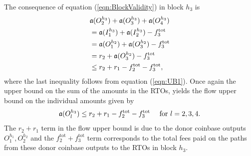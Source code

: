 The consequence of equation (\ref{eqn:BlockValidity}) in block $h_3$ is 
\begin{align*}
  & \mathfrak{a}(O_2^{h_3}) + \mathfrak{a}(O_3^{h_3}) + \mathfrak{a}(O_4^{h_3}) \nonumber \\
  & = \mathfrak{a}(I_1^{h_3}) + \mathfrak{a}(I_2^{h_3}) - f^{\text{tot}}_3 \nonumber \\
  & = \mathfrak{a}(O_1^{h_2}) + \mathfrak{a}(O_3^{h_2}) - f^{\text{tot}}_3 \nonumber \\
  & = r_2 + \mathfrak{a}(O_3^{h_2}) - f^{\text{tot}}_3 \nonumber \\
  &  \le r_2 + r_1 - f^{\text{tot}}_2 - f^{\text{tot}}_3,
\end{align*}
where the last inequality follows from equation (\ref{eqn:UB1}). Once again the upper bound on the sum of the amounts in the RTOs, yields the flow upper bound on the individual amounts given by
\begin{align}
  \amt(O_l^{h_3})  \le r_2 + r_1 - f^{\text{tot}}_2 - f^{\text{tot}}_3 \ \ \ \text{ for } l =2,3,4.
  \label{eqn:UB2}
\end{align}
The $r_2 + r_1$ term in the flow upper bound is due to the donor coinbase outputs $O_1^{h_1}, O_2^{h_2}$ and the $f^{\text{tot}}_2 + f^{\text{tot}}_3$ term corresponds to the total fees paid on the paths from these donor coinbase outputs to the RTOs in block $h_3$.
